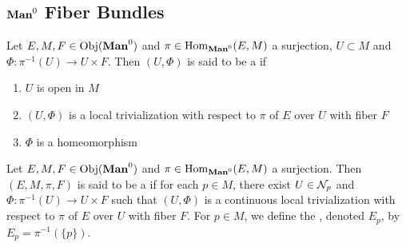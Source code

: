 \documentclass{book}
\begin{document}
	
	\subsection{$\Man0$ Fiber Bundles}
	
	\begin{defn} 
		Let $E, M, F \in \Obj(\Man0)$ and $\pi \in \Hom_{\Man0}(E, M)$ a surjection, $U \subset M$ and $\Phi: \pi^{-1}(U) \rightarrow U \times F$. Then $(U, \Phi)$ is said to be a   if 
		\begin{enumerate}
			\item $U$ is open in $M$
			\item $(U, \Phi)$ is a local trivialization with respect to $\pi$ of $E$ over $U$ with fiber $F$
			\item $\Phi$ is a homeomorphism
		\end{enumerate}
	\end{defn}
 
	\begin{defn} 
		Let $E,M, F \in \Obj(\Man0)$ and $\pi \in \Hom_{\Man0}(E, M)$ a surjection. Then $(E, M, \pi, F)$ is said to be a  if for each $p \in M$, there exist $U \in \mathcal{N}_p$ and $\Phi: \pi^{-1}(U) \rightarrow U \times F$ such that $(U, \Phi)$ is a continuous local trivialization with respect to $\pi$ of $E$ over $U$ with fiber $F$. For $p \in M$, we define the , denoted $E_p$, by $E_p = \pi^{-1}(\{p\})$.
	\end{defn}
\end{document}
